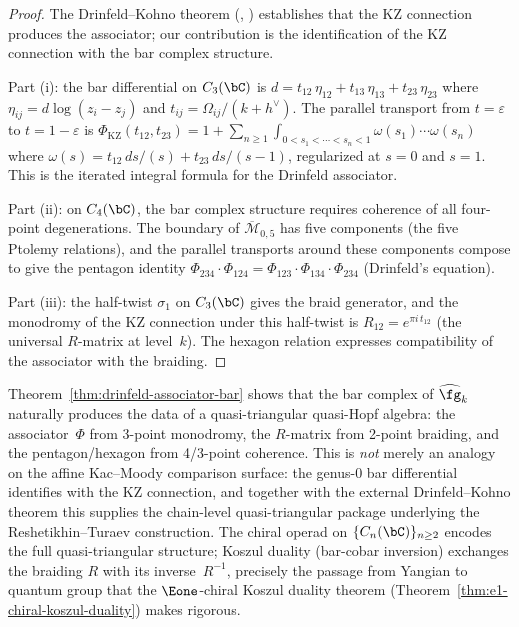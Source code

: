 \begin{proof}
The Drinfeld--Kohno theorem (\ClaimStatusProvedElsewhere,
\cite{Drinfeld90,Kohno87}) establishes that the KZ connection
produces the associator; our contribution is the identification
of the KZ connection with the bar complex structure.

Part (i): the bar differential on $C_3(\bC)$ is
$d = t_{12}\, \eta_{12} + t_{13}\, \eta_{13} + t_{23}\, \eta_{23}$
where $\eta_{ij} = d\log(z_i - z_j)$ and
$t_{ij} = \Omega_{ij}/(k+h^\vee)$. The parallel transport from
$t = \varepsilon$ to $t = 1 - \varepsilon$ is
$\Phi_{\mathrm{KZ}}(t_{12}, t_{23})
= 1 + \sum_{n \geq 1} \int_{0<s_1<\cdots<s_n<1}
\omega(s_1) \cdots \omega(s_n)$
where $\omega(s) = t_{12}\, ds/(s) + t_{23}\, ds/(s-1)$, regularized
at $s = 0$ and $s = 1$. This is the iterated integral formula for
the Drinfeld associator.

Part (ii): on $C_4(\bC)$, the bar complex structure requires
coherence of all four-point degenerations. The boundary of
$\overline{\mathcal{M}}_{0,5}$ has five components (the five
Ptolemy relations), and the parallel transports around these
components compose to give the pentagon identity
$\Phi_{234} \cdot \Phi_{124} = \Phi_{123} \cdot \Phi_{134} \cdot \Phi_{234}$
(Drinfeld's equation).

Part (iii): the half-twist $\sigma_1$ on $C_3(\bC)$ gives
the braid generator, and the monodromy of the KZ connection
under this half-twist is $R_{12} = e^{\pi i\, t_{12}}$
(the universal $R$-matrix at level~$k$). The hexagon relation
expresses compatibility of the associator with the braiding.
\end{proof}

\begin{remark}
\label{rem:bar-quasi-triangular}
Theorem~\ref{thm:drinfeld-associator-bar} shows that the bar
complex of $\widehat{\fg}_k$ naturally produces the data of a
quasi-triangular quasi-Hopf algebra: the associator~$\Phi$ from
3-point monodromy, the $R$-matrix from 2-point braiding, and the
pentagon/hexagon from 4/3-point coherence. This is
\emph{not} merely an analogy on the affine Kac--Moody
comparison surface: the genus-$0$ bar differential identifies
with the KZ connection, and together with the external
Drinfeld--Kohno theorem this supplies the chain-level
quasi-triangular package underlying the
Reshetikhin--Turaev construction.
The chiral operad on $\{C_n(\bC)\}_{n \geq 2}$ encodes the
full quasi-triangular structure; Koszul duality (bar-cobar
inversion) exchanges the braiding $R$ with its
inverse~$R^{-1}$, precisely the passage from Yangian to
quantum group that the $\Eone$-chiral Koszul duality theorem
(Theorem~\ref{thm:e1-chiral-koszul-duality}) makes rigorous.
\end{remark}


